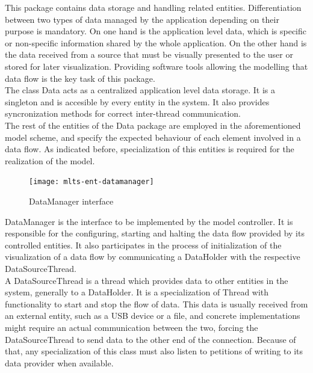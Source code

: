		This package contains data storage and handling related entities. Differentiation between two types of data managed by the application depending on their purpose is mandatory. On one hand is the application level data, which is specific or non-specific information shared by the whole application. On the other hand is the data received from a source that must be visually presented to the user or stored for later visualization. Providing software tools allowing the modelling that data flow is the key task of this package.\\

		The class Data acts as a centralized application level data storage. It is a singleton and is accesible by every entity in the system. It also provides syncronization methods for correct inter-thread communication.\\

		The rest of the entities of the Data package are employed in the aforementioned model scheme, and specify the expected behaviour of each element involved in a data flow. As indicated before, specialization of this entities is required for the realization of the model.\\

		\begin{figure}[h]
		\begin{center}
	    	\texttt{[image: mlts-ent-datamanager]}
  		\end{center}
  		\caption{DataManager interface}
		\end{figure}


		DataManager is the interface to be implemented by the model controller. It is responsible for the configuring, starting and halting the data flow provided by its controlled entities. It also participates in the process of initialization of the visualization  of a data flow by communicating a DataHolder with the respective DataSourceThread.\\

		A DataSourceThread is a thread which provides data to other entities in the system, generally to a DataHolder. It is a specialization of Thread with functionality to start and stop the flow of data. This data is usually received from an external entity, such as a USB device or a file, and concrete implementations  might require an actual communication between the two, forcing the DataSourceThread to send data to the other end of the connection. Because of that, any specialization of this class must also listen to petitions of writing to its data provider when available.\\

